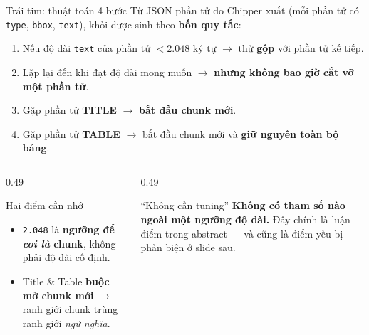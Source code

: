 \documentclass[aspectratio=169,11pt]{beamer}
\begin{document}
\begin{frame}{Trái tim: thuật toán 4 bước}
  {\small Từ JSON phần tử do Chipper xuất (mỗi phần tử có \texttt{type},
  \texttt{bbox}, \texttt{text}), khối được sinh theo \textbf{bốn quy tắc}:}
  \vspace{0.2em}
  \begin{block}{}
    \begin{enumerate}\small
      \item Nếu độ dài \texttt{text} của phần tử $\mathbf{< 2.048}$ ký tự
        $\rightarrow$ thử \textbf{gộp} với phần tử kế tiếp.
      \item Lặp lại đến khi đạt độ dài mong muốn
        $\rightarrow$ \textbf{nhưng không bao giờ cắt vỡ một phần tử}.
      \item Gặp phần tử \textbf{TITLE} $\rightarrow$ \textbf{bắt đầu chunk mới}.
      \item Gặp phần tử \textbf{TABLE} $\rightarrow$ bắt đầu chunk mới và
        \textbf{giữ nguyên toàn bộ bảng}.
    \end{enumerate}
  \end{block}
  \begin{columns}[T]
    \begin{column}{0.49\textwidth}
      \begin{alertblock}{\small Hai điểm cần nhớ}
        \begin{itemize}\small
          \item \texttt{2.048} là \textbf{ngưỡng để \emph{coi là} chunk}, không
            phải độ dài cố định.
          \item Title \& Table \textbf{buộc mở chunk mới} $\rightarrow$ ranh giới
            chunk trùng ranh giới \emph{ngữ nghĩa}.
        \end{itemize}
      \end{alertblock}
    \end{column}
    \begin{column}{0.49\textwidth}
      \begin{block}{\small ``Không cần tuning''}
        \textbf{Không có tham số nào ngoài một ngưỡng độ dài.} Đây chính là luận
        điểm trong abstract — và cũng là điểm yếu bị phản biện ở slide sau.
      \end{block}
    \end{column}
  \end{columns}
\end{frame}
\end{document}

